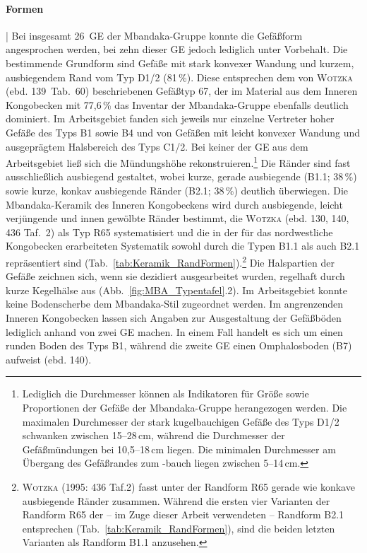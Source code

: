 \paragraph{Formen}\hspace{-.5em}|\hspace{.5em}%
Bei insgesamt 26~GE der Mbandaka-Gruppe konnte die Gefäßform angesprochen werden, bei zehn dieser GE jedoch lediglich unter Vorbehalt. Die bestimmende Grundform sind Gefäße mit stark konvexer Wandung und kurzem, ausbiegendem Rand vom Typ D1/2 (81\,\%). Diese entsprechen dem von \textsc{Wotzka} (ebd. 139~Tab.~60) beschriebenen Gefäßtyp 67, der im Material aus dem Inneren Kongobecken mit 77,6\,\% das Inventar der Mbandaka-Gruppe ebenfalls deutlich dominiert. Im Arbeitsgebiet fanden sich jeweils nur einzelne Vertreter hoher Gefäße des Typs B1 sowie B4 und von Gefäßen mit leicht konvexer Wandung und ausgeprägtem Halsbereich des Typs C1/2. Bei keiner der GE aus dem Arbeitsgebiet ließ sich die Mündungshöhe rekonstruieren.\footnote{Lediglich die Durchmesser können als Indikatoren für Größe sowie Proportionen der Gefäße der Mbandaka-Gruppe herangezogen werden. Die maximalen Durchmesser der stark kugelbauchigen Gefäße des Typs D1/2 schwanken zwischen 15--28\,cm, während die Durchmesser der Gefäßmündungen bei 10,5--18\,cm liegen. Die minimalen Durchmesser am Übergang des Gefäßrandes zum -bauch liegen zwischen 5--14\,cm.} Die Ränder sind fast ausschließlich ausbiegend gestaltet, wobei kurze, gerade ausbiegende (B1.1; 38\,\%) sowie kurze, konkav ausbiegende Ränder (B2.1; 38\,\%) deutlich überwiegen. Die Mbandaka-Keramik des Inneren Kongobeckens wird durch ausbiegende, leicht verjüngende und innen gewölbte Ränder bestimmt, die \textsc{Wotzka} (ebd. 130, 140, 436 Taf.~2) als Typ R65 systematisiert und die in der für das nordwestliche Kongobecken erarbeiteten Systematik sowohl durch die Typen B1.1 als auch B2.1 repräsentiert sind (Tab.~\ref{tab:Keramik_RandFormen}).\footnote{\textsc{Wotzka} (1995: 436 Taf.2) fasst unter der Randform R65 gerade wie konkave ausbiegende Ränder zusammen. Während die ersten vier Varianten der Randform R65 der -- im Zuge dieser Arbeit verwendeten -- Randform B2.1 entsprechen (Tab.~\ref{tab:Keramik_RandFormen}), sind die beiden letzten Varianten als Randform B1.1 anzusehen.} Die Halspartien der Gefäße zeichnen sich, wenn sie dezidiert ausgearbeitet wurden, regelhaft durch kurze Kegelhälse aus (Abb.~\ref{fig:MBA_Typentafel}.2). Im Arbeitsgebiet konnte keine Bodenscherbe dem Mbandaka-Stil zugeordnet werden. Im angrenzenden Inneren Kongobecken lassen sich Angaben zur Ausgestaltung der Gefäßböden lediglich anhand von zwei GE machen. In einem Fall handelt es sich um einen runden Boden des Typs B1, während die zweite GE einen Omphalosboden (B7) aufweist (ebd. 140). 

